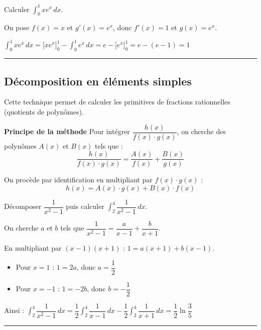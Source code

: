 \documentclass[../PolyS2.tex]{subfiles}
\begin{document}
\begin{Ex}
Calculer $\displaystyle\int_0^1 x e^x \, dx$.

On pose $f(x) = x$ et $g'(x) = e^x$, donc $f'(x) = 1$ et $g(x) = e^x$.

$\displaystyle\int_0^1 x e^x \, dx = \big[x e^x\big]_0^1 - \int_0^1 e^x \, dx = e - \big[e^x\big]_0^1 = e - (e - 1) = 1$
\end{Ex}

\vspace{1em}\hrule\vspace{1em}

\subsection{Décomposition en éléments simples}

Cette technique permet de calculer les primitives de fractions rationnelles (quotients de polynômes).

\begin{Meth}\textbf{Principe de la méthode}
Pour intégrer $\dfrac{h(x)}{f(x) \cdot g(x)}$, on cherche des polynômes $A(x)$ et $B(x)$ tels que :
$$\frac{h(x)}{f(x) \cdot g(x)} = \frac{A(x)}{f(x)} + \frac{B(x)}{g(x)}$$

On procède par identification en multipliant par $f(x) \cdot g(x)$ :
$$h(x) = A(x) \cdot g(x) + B(x) \cdot f(x)$$
\end{Meth}

\begin{Ex}
Décomposer $\dfrac{1}{x^2-1}$ puis calculer $\displaystyle\int_2^4 \dfrac{1}{x^2-1} \, dx$.

On cherche $a$ et $b$ tels que $\dfrac{1}{x^2-1} = \dfrac{a}{x-1} + \dfrac{b}{x+1}$.

En multipliant par $(x-1)(x+1)$ : $1 = a(x+1) + b(x-1)$.
\begin{itemize}
\item Pour $x = 1$ : $1 = 2a$, donc $a = \dfrac{1}{2}$
\item Pour $x = -1$ : $1 = -2b$, donc $b = -\dfrac{1}{2}$
\end{itemize}

Ainsi : $\displaystyle\int_2^4 \dfrac{1}{x^2-1} \, dx = \dfrac{1}{2}\int_2^4 \dfrac{1}{x-1} \, dx - \dfrac{1}{2}\int_2^4 \dfrac{1}{x+1} \, dx = \dfrac{1}{2}\ln\dfrac{3}{5}$
\end{Ex}

\vspace{1em}\hrule\vspace{1em}
\end{document}
